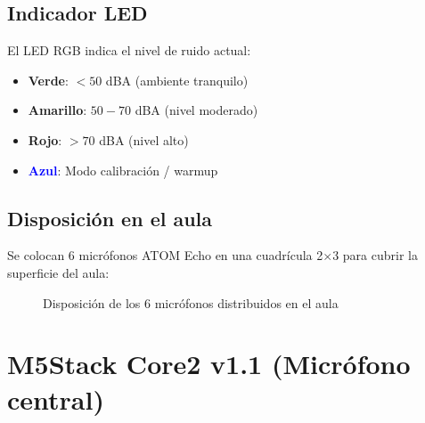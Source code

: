 \documentclass[12pt,a4paper]{report}
\begin{document}
\subsection{Indicador LED}

El LED RGB indica el nivel de ruido actual:

\begin{itemize}
    \item \textcolor{dbgreen}{\textbf{Verde}}: $< 50$ dBA (ambiente tranquilo)
    \item \textcolor{dbyellow}{\textbf{Amarillo}}: $50-70$ dBA (nivel moderado)
    \item \textcolor{dbred}{\textbf{Rojo}}: $> 70$ dBA (nivel alto)
    \item \textcolor{blue}{\textbf{Azul}}: Modo calibraci\'on / warmup
\end{itemize}

\subsection{Disposici\'on en el aula}

Se colocan 6 micr\'ofonos ATOM Echo en una cuadr\'icula 2$\times$3 para cubrir la superficie del aula:

\begin{figure}[H]
\centering
{}
\caption{Disposici\'on de los 6 micr\'ofonos distribuidos en el aula}
\end{figure}

\section{M5Stack Core2 v1.1 (Micr\'ofono central)}
\end{document}
